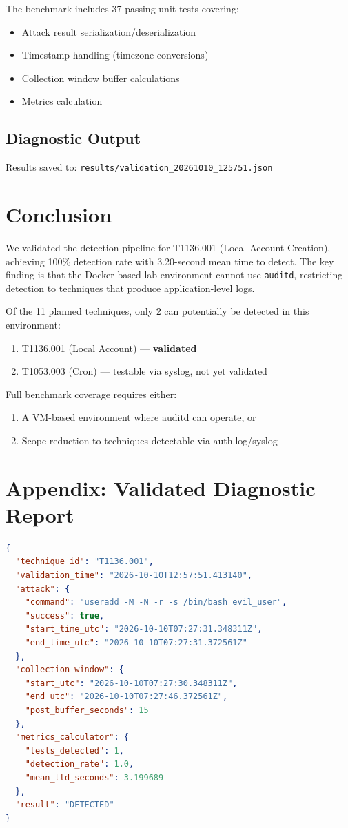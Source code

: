 \documentclass[11pt,a4paper]{article}
\begin{document}
The benchmark includes 37 passing unit tests covering:
\begin{itemize}
    \item Attack result serialization/deserialization
    \item Timestamp handling (timezone conversions)
    \item Collection window buffer calculations
    \item Metrics calculation
\end{itemize}

\subsection{Diagnostic Output}

Results saved to: \texttt{results/validation\_20261010\_125751.json}

\section{Conclusion}

We validated the detection pipeline for T1136.001 (Local Account Creation), achieving 100\% detection rate with 3.20-second mean time to detect. The key finding is that the Docker-based lab environment cannot use \texttt{auditd}, restricting detection to techniques that produce application-level logs.

Of the 11 planned techniques, only 2 can potentially be detected in this environment:
\begin{enumerate}
    \item T1136.001 (Local Account) --- \textbf{validated}
    \item T1053.003 (Cron) --- testable via syslog, not yet validated
\end{enumerate}

Full benchmark coverage requires either:
\begin{enumerate}
    \item A VM-based environment where auditd can operate, or
    \item Scope reduction to techniques detectable via auth.log/syslog
\end{enumerate}

\section*{Appendix: Validated Diagnostic Report}

\begin{lstlisting}[language=json,caption={validation\_20261010\_125751.json}]
{
  "technique_id": "T1136.001",
  "validation_time": "2026-10-10T12:57:51.413140",
  "attack": {
    "command": "useradd -M -N -r -s /bin/bash evil_user",
    "success": true,
    "start_time_utc": "2026-10-10T07:27:31.348311Z",
    "end_time_utc": "2026-10-10T07:27:31.372561Z"
  },
  "collection_window": {
    "start_utc": "2026-10-10T07:27:30.348311Z",
    "end_utc": "2026-10-10T07:27:46.372561Z",
    "post_buffer_seconds": 15
  },
  "metrics_calculator": {
    "tests_detected": 1,
    "detection_rate": 1.0,
    "mean_ttd_seconds": 3.199689
  },
  "result": "DETECTED"
}
\end{lstlisting}
\end{document}
